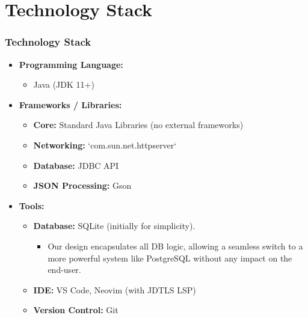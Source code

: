 \documentclass{beamer}
\begin{document}
\section{Technology Stack}
\begin{frame}
    \frametitle{Technology Stack}
    \begin{itemize}
        \item \textbf{Programming Language:}
        \begin{itemize}
            \item Java (JDK 11+)
        \end{itemize}
        \pause
        \item \textbf{Frameworks / Libraries:}
        \begin{itemize}
            \item \textbf{Core:} Standard Java Libraries (no external frameworks)
            \item \textbf{Networking:} `com.sun.net.httpserver`
            \item \textbf{Database:} JDBC API
            \item \textbf{JSON Processing:} Gson
        \end{itemize}
        \pause
        \item \textbf{Tools:}
        \begin{itemize}
            \item \textbf{Database:} SQLite (initially for simplicity).
            \begin{itemize}
                \item \small Our design encapsulates all DB logic, allowing a seamless switch to a more powerful system like PostgreSQL without any impact on the end-user.
            \end{itemize}
            \item \textbf{IDE:} VS Code, Neovim (with JDTLS LSP)
            \item \textbf{Version Control:} Git
        \end{itemize}
    \end{itemize}
\end{frame}
\end{document}
